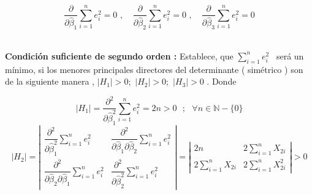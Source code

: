 \documentclass[10pt,a4paper, openany ]{book}
\begin{document}
  \begin{equation*}
      \dfrac{\partial}{\partial{\hat{\beta}_{1}}}\sum\limits_{i=1}^{n}e^{2}_{i} = 0 \, \,  ,  \,   \,   \,   \, \, \  \dfrac{\partial}{\partial{\hat{\beta}_{2}}}\sum\limits_{i=1}^{n}e^{2}_{i} = 0 \, \, ,  \,   \,   \,   \, \, \, \dfrac{\partial}{\partial{\hat{\beta}_{3}}}\sum\limits_{i=1}^{n}e^{2}_{i} = 0 
  \end{equation*}
  \\
  \begin{center}
  \justifying
  \textbf{Condición suficiente de segundo orden  :}
  Establece, que $\sum\limits_{i=1}^{n}e^{2}_{i} $ \,  será un mínimo, si los menores principales directores del determinante ( simétrico ) son de la siguiente manera ,  $ |H_{1}| >  0 ; \, \, |H_{2}|> 0 ;\, \, |H_{3}| >   0 $ . 
  Donde  
  \end{center}
  \begin{equation*}
      \left |
          H_{1}
  \right | = \dfrac{\partial^{2}}{\partial\hat{\beta}^{2}_{1}}\sum\limits_{i = 1}^{n}e_{i}^{2} = 2n > 0 \, \, \, \,  ;\, \, \, \, \forall n \in \mathbb N - \{ 0 \}
  \end{equation*}
  \begin{equation*}
  \left|H_{2} \right | =  \left |\begin{array}{cc}
          \dfrac{\partial^{2}}{\partial\hat{\beta}^{2}_{1}}\sum\limits_{i = 1}^{n}e_{i}^{2}     &  \dfrac{\partial^{2}}{\partial\hat{\beta}_{1}\partial\hat{\beta}_{2}}\sum\limits_{i = 1}^{n}e_{i}^{2}   \\
            \dfrac{\partial^{2}}{\partial\hat{\beta}_{2}\partial\hat{\beta}_{1}}\sum\limits_{i = 1}^{n}e_{i}^{2}  & \dfrac{\partial^{2}}{\partial\hat{\beta}^{2}_{2}}\sum\limits_{i = 1}^{n}e_{i}^{2}
      \end{array}   \right | = \left  |\begin{array}{cc}
          2n     &  2\sum\limits_{i=1}^{n}X_{2i}  \\
            2\sum\limits_{i=1}^{n}X_{2i} & 2\sum\limits_{i=1}^{n}X^{2}_{2i}
      \end{array}   \right |  > 0
  \end{equation*}
\end{document}
